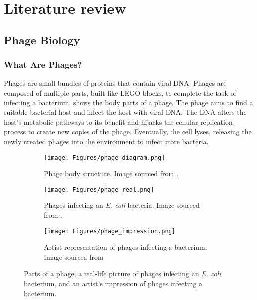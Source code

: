 \chapter{Literature review}
\label{LR}

\section{Phage Biology}
\subsection{What Are Phages?}
Phages are small bundles of proteins that contain viral DNA. 
Phages are composed of multiple parts, built like LEGO blocks, to complete the task of infecting a bacterium. 
 shows the body parts of a phage. 
The phage aims to find a suitable bacterial host and infect the host with viral DNA. 
The DNA alters the host's metabolic pathways to its benefit and hijacks the cellular replication process to create new copies of the phage. 
Eventually, the cell lyses, releasing the newly created phages into the environment to infect more bacteria. 
\begin{figure}[h!]
    \centering
    \begin{subfigure}{0.25\linewidth}
        \centering
        \captionsetup{width=1\linewidth}
        \texttt{[image: Figures/phage\_diagram.png]}
        \caption{
            Phage body structure. 
            Image sourced from \citet{FlatIllustrationBacteriophage}. 
        }
        \label{fig:figures:phage_diagram}
    \end{subfigure}
    \hfill
    \begin{subfigure}{0.3\linewidth}
        \centering
        \captionsetup{width=1\linewidth}
        \texttt{[image: Figures/phage\_real.png]}
        \caption{
            Phages infecting an \textit{E. coli} bacteria. 
            Image sourced from \citet{twilleyWorldViralDark2015}. 
        }
        \label{fig:figures:phage_real}
    \end{subfigure}
    \hfill
    \begin{subfigure}{0.35\linewidth}
        \centering
        \captionsetup{width=1\linewidth}
        \texttt{[image: Figures/phage\_impression.png]}
        \caption{
            Artist representation of phages infecting a bacterium. 
            Image sourced from \citet{VirusesMayPlay} 
        }
        \label{fig:figures:phage_impression}
    \end{subfigure}
    \caption{Parts of a phage, a real-life picture of phages infecting an \textit{E. coli} bacterium, and an artist's impression of phages infecting a bacterium. }
\end{figure}

